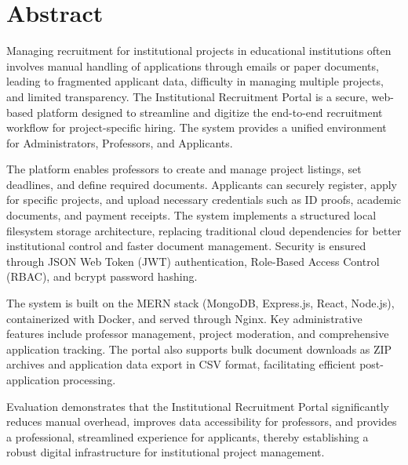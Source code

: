 \newpage
\chapter*{\centering Abstract}

Managing recruitment for institutional projects in educational institutions often involves manual handling of applications through emails or paper documents, leading to fragmented applicant data, difficulty in managing multiple projects, and limited transparency. The Institutional Recruitment Portal is a secure, web-based platform designed to streamline and digitize the end-to-end recruitment workflow for project-specific hiring. The system provides a unified environment for Administrators, Professors, and Applicants.

The platform enables professors to create and manage project listings, set deadlines, and define required documents. Applicants can securely register, apply for specific projects, and upload necessary credentials such as ID proofs, academic documents, and payment receipts. The system implements a structured local filesystem storage architecture, replacing traditional cloud dependencies for better institutional control and faster document management. Security is ensured through JSON Web Token (JWT) authentication, Role-Based Access Control (RBAC), and bcrypt password hashing.

The system is built on the MERN stack (MongoDB, Express.js, React, Node.js), containerized with Docker, and served through Nginx. Key administrative features include professor management, project moderation, and comprehensive application tracking. The portal also supports bulk document downloads as ZIP archives and application data export in CSV format, facilitating efficient post-application processing.

Evaluation demonstrates that the Institutional Recruitment Portal significantly reduces manual overhead, improves data accessibility for professors, and provides a professional, streamlined experience for applicants, thereby establishing a robust digital infrastructure for institutional project management.
